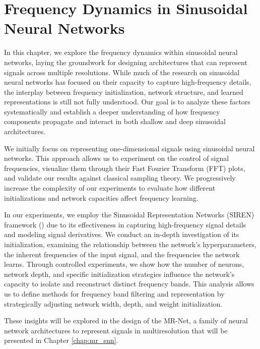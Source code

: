 \chapter{Frequency Dynamics in Sinusoidal Neural Networks}
\label{chap:sinusoidal}

In this chapter, we explore the frequency dynamics within sinusoidal neural networks, laying the groundwork for designing architectures that can represent signals across multiple resolutions. While much of the research on sinusoidal neural networks has focused on their capacity to capture high-frequency details, the interplay between frequency initialization, network structure, and learned representations is still not fully understood. Our goal is to analyze these factors systematically and establish a deeper understanding of how frequency components propagate and interact in both shallow and deep sinusoidal architectures.

We initially focus on representing one-dimensional signals using sinusoidal neural networks. This approach allows us to experiment on the control of signal frequencies, visualize them through their Fast Fourier Transform (FFT) plots, and validate our results against classical sampling theory. We progressively increase the complexity of our experiments to evaluate how different initializations and network capacities affect frequency learning.

In our experiments, we employ the Sinusoidal Representation Networks (SIREN) framework (\cite{sitzmann2019siren}) due to its effectiveness in capturing high-frequency signal details and modeling signal derivatives. We conduct an in-depth investigation of its initialization, examining the relationship between the network’s hyperparameters, the inherent frequencies of the input signal, and the frequencies the network learns. Through controlled experiments, we show how the number of neurons, network depth, and specific initialization strategies influence the network's capacity to isolate and reconstruct distinct frequency bands. This analysis allows us to define methods for frequency band filtering and representation by strategically adjusting network width, depth, and weight initialization. 

 These insights will be explored in the design of the MR-Net, a family of neural network architectures to represent signals in multiresolution that will be presented in Chapter \ref{chap:mr_snn}.


